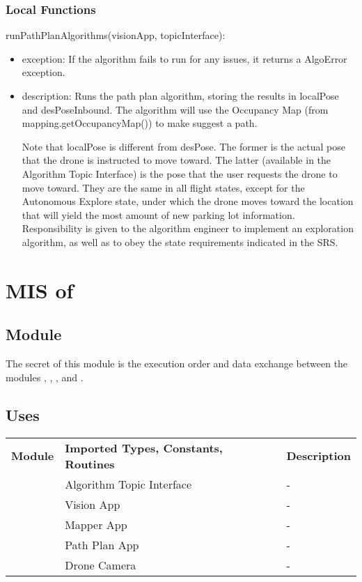 \documentclass[12pt, titlepage]{article}
\begin{document}
\subsubsection{Local Functions}
\noindent runPathPlanAlgorithms(visionApp, topicInterface):
\begin{itemize}
\item exception: If the algorithm fails to run for any issues, it returns a AlgoError exception. 
\item description: Runs the path plan algorithm, storing the results in localPose and desPoseInbound. The algorithm will use the Occupancy Map (from mapping.getOccupancyMap()) to make suggest a path. 

Note that localPose is different from desPose. The former is the actual pose that the drone is instructed to move toward. The latter (available in the Algorithm Topic Interface) is the pose that the  user requests the drone to move toward. They are the same in all flight states, except for the Autonomous Explore state, under which the drone moves toward the location that will yield the most amount of new parking lot information. Responsibility is given to the algorithm engineer to implement an exploration algorithm, as well as to obey the state requirements indicated in the SRS.
\end{itemize}
\newpage





\section{MIS of } \label{MIS_ALGORITHM_APP} 
\subsection{Module}
The secret of this module is the execution order and data exchange between the modules , , , and . 
\subsection{Uses}
\begin{center}
\begin{tabular}{p{2 cm} p{5cm} p{6.5cm} } 
\hline
\textbf{Module} & \textbf{Imported Types, Constants, Routines} & \textbf{Description} \\
\nameref{Algorithm Topic Interface} & Algorithm Topic Interface & - \\
\nameref{Vision App} & Vision App  & - \\
\nameref{Mapper App} & Mapper App  & - \\
\nameref{Path Plan App} & Path Plan App  & - \\
\nameref{Drone Camera} & Drone Camera  & - \\
\hline
\hline
\end{tabular}
\end{center}
\end{document}

